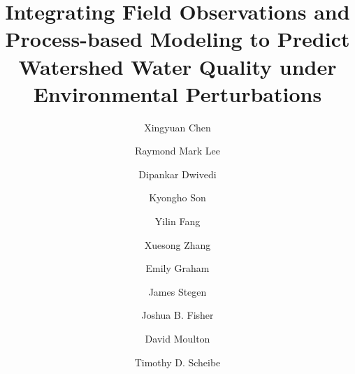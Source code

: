 \documentclass[preprint,review, 12pt]{elsarticle}
\begin{document}
\begin{frontmatter}



\title{Integrating Field Observations and Process-based Modeling to Predict Watershed Water Quality under Environmental Perturbations}


\author{Xingyuan Chen}
\author[label1]{Raymond Mark Lee}
\author{Dipankar Dwivedi}
\author[label1]{Kyongho Son}
\author[label1]{Yilin Fang}
\author[label1]{Xuesong Zhang}
\author[label1]{Emily Graham}
\author[label1]{James Stegen}
\author{Joshua B. Fisher}
\author{David Moulton}
\author[label1]{Timothy D. Scheibe}





\end{frontmatter}
\end{document}
